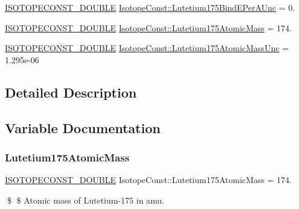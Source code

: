 \begin{DoxyCompactItemize}
\mbox{\hyperlink{group___isotope_const-_macros_ga8f45a7272ce02c0b4c65c44636ed719a}{I\+S\+O\+T\+O\+P\+E\+C\+O\+N\+S\+T\+\_\+\+D\+O\+U\+B\+LE}} \mbox{\hyperlink{group___isotope_const-_lutetium-_lu175_ga12ca9dab3cfc9b4769095f40e833a560}{Isotope\+Const\+::\+Lutetium175\+Bind\+E\+Per\+A\+Unc}} = 0.
\item 
\mbox{\hyperlink{group___isotope_const-_macros_ga8f45a7272ce02c0b4c65c44636ed719a}{I\+S\+O\+T\+O\+P\+E\+C\+O\+N\+S\+T\+\_\+\+D\+O\+U\+B\+LE}} \mbox{\hyperlink{group___isotope_const-_lutetium-_lu175_ga9e3c1d8421c5642d3dc0e466839520f0}{Isotope\+Const\+::\+Lutetium175\+Atomic\+Mass}} = 174.
\item 
\mbox{\hyperlink{group___isotope_const-_macros_ga8f45a7272ce02c0b4c65c44636ed719a}{I\+S\+O\+T\+O\+P\+E\+C\+O\+N\+S\+T\+\_\+\+D\+O\+U\+B\+LE}} \mbox{\hyperlink{group___isotope_const-_lutetium-_lu175_ga32fa5e1d62b7ff835bce7728160d2295}{Isotope\+Const\+::\+Lutetium175\+Atomic\+Mass\+Unc}} = 1.\+295e-\/06
\end{DoxyCompactItemize}


\subsection{Detailed Description}


\subsection{Variable Documentation}
\mbox{\label{group___isotope_const-_lutetium-_lu175_ga9e3c1d8421c5642d3dc0e466839520f0}} 
\subsubsection{\texorpdfstring{Lutetium175\+Atomic\+Mass}{Lutetium175AtomicMass}}
{\footnotesize\ttfamily \mbox{\hyperlink{group___isotope_const-_macros_ga8f45a7272ce02c0b4c65c44636ed719a}{I\+S\+O\+T\+O\+P\+E\+C\+O\+N\+S\+T\+\_\+\+D\+O\+U\+B\+LE}} Isotope\+Const\+::\+Lutetium175\+Atomic\+Mass = 174.}

\$ \$ Atomic mass of Lutetium-\/175 in amu. \mbox{\label{group___isotope_const-_lutetium-_lu175_ga32fa5e1d62b7ff835bce7728160d2295}} 
